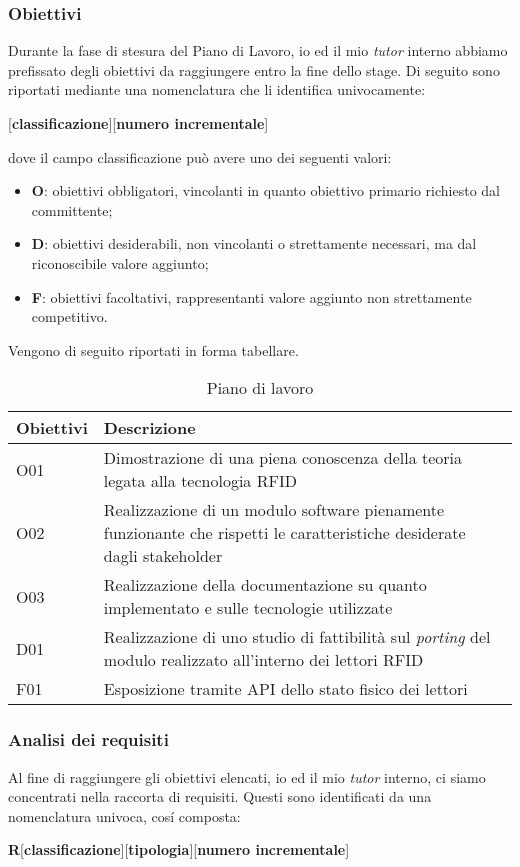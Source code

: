 \subsubsection*{Obiettivi}
\label{sub-sub-sec:obiettivi-cap-3}
Durante la fase di stesura del Piano di Lavoro, io ed il mio \emph{tutor} interno abbiamo prefissato degli obiettivi da raggiungere entro la fine dello stage.
Di seguito sono riportati mediante una nomenclatura che li identifica univocamente:
\begin{center}
    [\textbf{classificazione}][\textbf{numero incrementale}]
\end{center}
dove il campo classificazione può avere uno dei seguenti valori:
\begin{itemize}
    \item \textbf{O}: obiettivi obbligatori, vincolanti in quanto obiettivo primario richiesto dal committente;
    \item \textbf{D}: obiettivi desiderabili, non vincolanti o strettamente necessari, ma dal riconoscibile valore aggiunto;
    \item \textbf{F}: obiettivi facoltativi, rappresentanti valore aggiunto non strettamente competitivo.
\end{itemize}
Vengono di seguito riportati in forma tabellare.
\begin{table}[h!]
    \label{tab:obiettivi}
    \begin{tabularx}{\textwidth}{ | X | X |}
    \hline
    \textbf{Obiettivi} & \textbf{Descrizione}\\
    \hline
    O01 & Dimostrazione di una piena conoscenza della teoria legata alla tecnologia RFID \\
    \hline
    O02 & Realizzazione di un modulo software pienamente funzionante che rispetti le caratteristiche desiderate dagli stakeholder \\
    \hline
    O03 & Realizzazione della documentazione su quanto implementato e sulle tecnologie utilizzate \\
    \hline
    D01 & Realizzazione di uno studio di fattibilità sul \emph{porting} del modulo realizzato all'interno dei lettori RFID \\
    \hline
    F01 & Esposizione tramite API dello stato fisico dei lettori \\
    \hline
    \end{tabularx}
    \caption{Piano di lavoro}
\end{table}

\subsubsection*{Analisi dei requisiti}
\label{sub-sec:req}
Al fine di raggiungere gli obiettivi elencati, io ed il mio \emph{tutor} interno, ci siamo concentrati nella raccorta di requisiti. Questi sono identificati
da una nomenclatura univoca, cosí composta:
\begin{center}
    \textbf{R}[\textbf{classificazione}][\textbf{tipologia}][\textbf{numero incrementale}]
\end{center}

